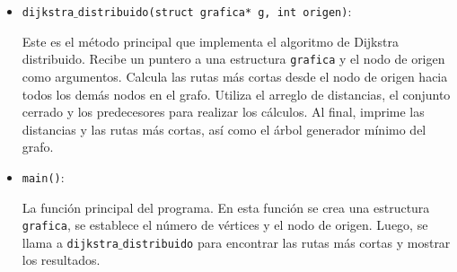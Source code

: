 \documentclass[a4paper,12pt]{article}
\begin{document}
\begin{itemize}
    \item \texttt{dijkstra$\_$distribuido(struct grafica* g, int origen)}: 
    
    Este es el método principal que implementa el algoritmo de Dijkstra distribuido. Recibe un puntero a una estructura \texttt{grafica} y el nodo de origen como argumentos. Calcula las rutas más cortas desde el nodo de origen hacia todos los demás nodos en el grafo. Utiliza el arreglo de distancias, el conjunto cerrado y los predecesores para realizar los cálculos. Al final, imprime las distancias y las rutas más cortas, así como el árbol generador mínimo del grafo.

    \item \texttt{main()}: 
    
    La función principal del programa. En esta función se crea una estructura \texttt{grafica}, se establece el número de vértices y el nodo de origen. Luego, se llama a \texttt{dijkstra$\_$distribuido} para encontrar las rutas más cortas y mostrar los resultados.
\end{itemize}
\end{document}
